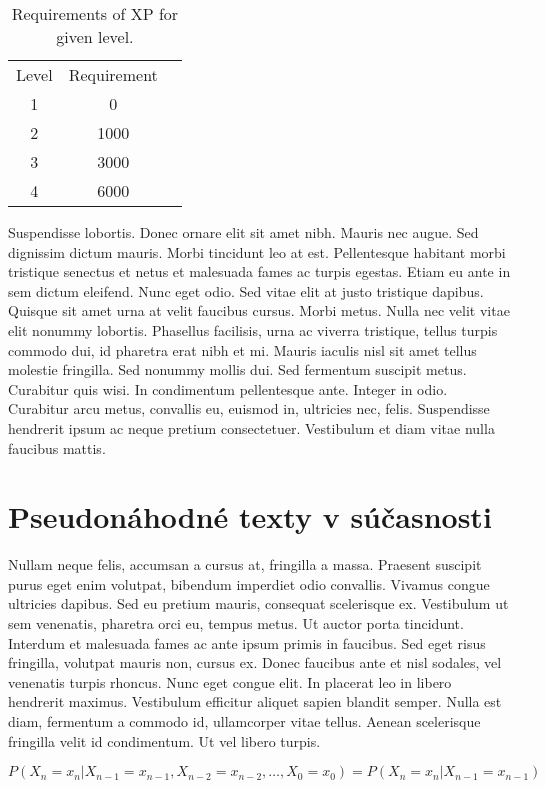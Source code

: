 \documentclass[thesismargins, thesislinespacing, twoside, draft, upjsfrontpage]{rnthesis}
\begin{document}
\begin{table}
\begin{center}
\begin{tabular}{ccc}
Level & Requirement\\
1 & 0\\
2 & 1000\\
3 & 3000\\
4 & 6000
\end{tabular}
\end{center}
\caption{Requirements of XP for given level.}
\end{table}
Suspendisse lobortis. Donec ornare elit sit amet nibh. Mauris nec
augue. Sed dignissim dictum mauris. Morbi tincidunt leo at est.
Pellentesque habitant morbi tristique senectus et netus et
malesuada fames ac turpis egestas. Etiam eu ante in sem dictum
eleifend. Nunc eget odio. Sed vitae elit at justo tristique
dapibus. Quisque sit amet urna at velit faucibus cursus.
Morbi metus. Nulla nec velit vitae elit
nonummy lobortis. Phasellus facilisis, urna ac viverra tristique,
tellus turpis commodo dui, id pharetra erat nibh et mi. Mauris
iaculis nisl sit amet tellus molestie fringilla. Sed nonummy mollis
dui. Sed fermentum suscipit metus. Curabitur quis wisi. In
condimentum pellentesque ante. Integer in odio. Curabitur arcu
metus, convallis eu, euismod in, ultricies nec, felis. Suspendisse
hendrerit ipsum ac neque pretium consectetuer. Vestibulum et diam
vitae nulla faucibus mattis. 


\chapter{Pseudonáhodné texty v súčasnosti}

Nullam neque felis, accumsan a cursus at, fringilla a massa. Praesent suscipit purus eget enim volutpat, bibendum imperdiet odio convallis. Vivamus congue ultricies dapibus. Sed eu pretium mauris, consequat scelerisque ex. Vestibulum ut sem venenatis, pharetra orci eu, tempus metus. Ut auctor porta tincidunt. Interdum et malesuada fames ac ante ipsum primis in faucibus. Sed eget risus fringilla, volutpat mauris non, cursus ex. Donec faucibus ante et nisl sodales, vel venenatis turpis rhoncus. Nunc eget congue elit. In placerat leo in libero hendrerit maximus. Vestibulum efficitur aliquet sapien blandit semper. Nulla est diam, fermentum a commodo id, ullamcorper vitae tellus. Aenean scelerisque fringilla velit id condimentum. Ut vel libero turpis.

\begin{equation}
P(X_n = x_n | X_{n - 1} = x_{n - 1}, X_{n - 2} = x_{n - 2}, \dots, X_0 = x_0) = P(X_n = x_n | X_{n - 1} = x_{n - 1})
\end{equation}
\end{document}
